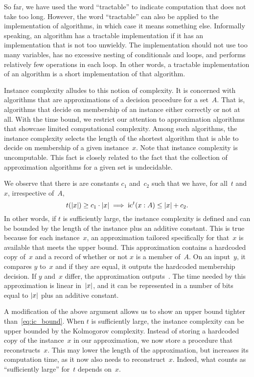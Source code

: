 \begin{example}
\label{ex:ic}%
  So far, we have used the word \enquote{tractable} to indicate computation that does not take too long.
  However, the word \enquote{tractable} can also be applied to the implementation of algorithms, in which case it means something else.
  Informally speaking, an algorithm has a tractable implementation if it has an implementation that is not too unwieldy.
  The implementation should not use too many variables, has no excessive nesting of conditionals and loops, and performs relatively few operations in each loop.
  In other words, a tractable implementation of an algorithm is a short implementation of that algorithm.

  Instance complexity alludes to this notion of complexity.
  It is concerned with algorithms that are approximations of a decision procedure for a set~$A$.
  That is, algorithms that decide on membership of an instance either correctly or not at all.
  With the time bound, we restrict our attention to approximation algorithms that showcase limited computational complexity.
  Among such algorithms, the instance complexity selects the length of the shortest algorithm that is able to decide on membership of a given instance~$x$.
  Note that instance complexity is uncomputable.
  This fact is closely related to the fact that the collection of approximation algorithms for a given set is undecidable.

  We observe that there is are constants $c_1$ and~$c_2$ such that we have, for all~$t$ and~$x$, irrespective of~$A$,
  \begin{equation}
  \label{eq:ic_bound}
    t({\lvert x\rvert}) \ge c_1 \cdot {\lvert x\rvert} \implies \operatorname{ic}^t(x : A) \le {\lvert x\rvert} + c_2.
  \end{equation}
  In other words, if $t$ is sufficiently large, the instance complexity is defined and can be bounded by the length of the instance plus an additive constant.
  This is true because for each instance~$x$, an approximation tailored specifically for that~$x$ is available that meets the upper bound.
  This approximation contains a hardcoded copy of~$x$ and a record of whether or not $x$ is a member of~$A$.
  On an input~$y$, it compares $y$ to~$x$ and if they are equal, it outputs the hardcoded membership decision.
  If $y$ and~$x$ differ, the approximation outputs~.
  The time needed by this approximation is linear in~${\lvert x\rvert}$, and it can be represented in a number of bits equal to ${\lvert x\rvert}$ plus an additive constant.

  A modification of the above argument allows us to show an upper bound tighter than~\eqref{eq:ic_bound}.
  When $t$ is sufficiently large, the instance complexity can be upper bounded by the Kolmogorov complexity.
  Instead of storing a hardcoded copy of the instance~$x$ in our approximation, we now store a procedure that reconstructs~$x$.
  This may lower the length of the approximation, but increases its computation time, as it now also needs to reconstruct~$x$.
  Indeed, what counts as \enquote{sufficiently large} for~$t$ depends on~$x$.
\end{example}

